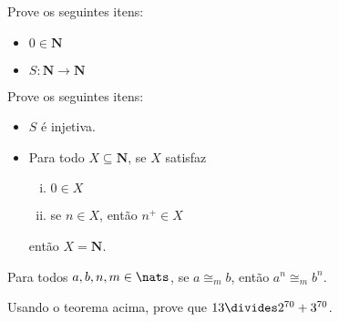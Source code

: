 \begin{exercise}

	Prove os seguintes itens: 
	\begin{itemize}
		\item $0 \in \mathbf{N}$
		\item $S : \mathbf{N} \to \mathbf{N}$
	\end{itemize}
\end{exercise}

\begin{homework}

	Prove os seguintes itens:
	\begin{itemize}
		\item $S$ é injetiva.
		\item Para todo $X \subseteq \mathbf{N}$, se $X$ satisfaz
			\begin{enumerate}[(i)]
				\item $0 \in X$
				\item se $n \in X$, então $n^+ \in X$
			\end{enumerate}
			então $X = \mathbf{N}$.
	\end{itemize}
\end{homework}

\begin{theorem} Para todos $a, b, n, m \in \nats$, se $a \cong_m b$, então $a^n \cong_m b^n$.\end{theorem}

\begin{exercise}

	Usando o teorema acima, prove que $13 \divides 2^{70} + 3^{70}$. 
\end{exercise}
